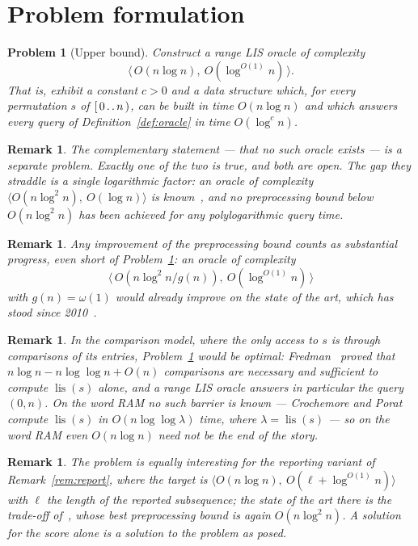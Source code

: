 \documentclass[10pt]{article}
\newtheorem{problem}{Problem}
\newtheorem{remark}[theorem]{Remark}
\newcommand{\lis}{\operatorname{lis}}
\newcommand{\poly}{\log^{O(1)}}
\begin{document}
\section{Problem formulation}

\begin{problem}[Upper bound]\label{prob:upper}
Construct a range LIS oracle of complexity
\[
\bigl\langle\, O(n\log n),\ O(\poly n)\,\bigr\rangle .
\]
That is, exhibit a constant $c>0$ and a data structure which, for every
permutation $s$ of $[\,0\mathinner{.\,.}n\,)$, can be built in time $O(n\log n)$ and which
answers every query of Definition~\ref{def:oracle} in time $O(\log^{c}n)$.
\end{problem}

\begin{remark}\label{rem:dichotomy}
The complementary statement --- that no such oracle exists --- is a separate
problem. Exactly one of the two is true, and both are open. The gap
they straddle is a single logarithmic factor: an oracle of complexity
$\langle O(n\log^2n),\ O(\log n)\rangle$ is known~\cite{Tiskin15,TiskinArXiv}, and
no preprocessing bound below $O(n\log^2 n)$ has been achieved for any
polylogarithmic query time.
\end{remark}

\begin{remark}\label{rem:partial}
Any improvement of the preprocessing bound counts as substantial progress, even
short of Problem~\ref{prob:upper}: an oracle of complexity
\[
\bigl\langle\, O(n\log^2n/g(n)),\ O(\poly n)\,\bigr\rangle
\]
with $g(n)=\omega(1)$ would already improve on the state of the art, which has
stood since 2010~\cite{Tiskin15,TiskinArXiv}.
\end{remark}

\begin{remark}\label{rem:models}
In the comparison model, where the only access to $s$ is through comparisons of
its entries, Problem~\ref{prob:upper} would be optimal: Fredman~\cite{Fredman75}
proved that $n\log n-n\log\log n+O(n)$ comparisons are necessary and sufficient
to compute $\lis(s)$ alone, and a range LIS oracle answers in particular the
query $(0,n)$. On the word RAM no such barrier is known --- Crochemore and
Porat~\cite{CP10} compute $\lis(s)$ in $O(n\log\log\lambda)$ time, where
$\lambda=\lis(s)$ --- so on the word RAM even $O(n\log n)$ need not be the end
of the story.
\end{remark}

\begin{remark}\label{rem:reportvariant}
The problem is equally interesting for the reporting variant of
Remark~\ref{rem:report}, where the target is
$\bigl\langle O(n\log n),\ O(\ell+\poly n)\bigr\rangle$ with $\ell$ the length
of the reported subsequence; the state of the art there is the trade-off of~\cite[Theorem
1.3]{GGK25}, whose best preprocessing bound is again
$O(n\log^2n)$. A solution for the score alone is a solution
to the problem as posed.
\end{remark}
\end{document}
